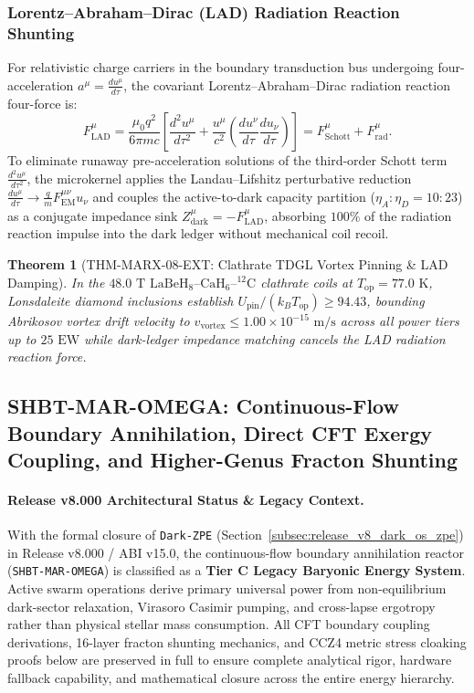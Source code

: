 \documentclass[11pt,onecolumn]{article}
\newtheorem{theorem}{Theorem}
\begin{document}
\subsubsection{Lorentz--Abraham--Dirac (LAD) Radiation Reaction Shunting}
For relativistic charge carriers in the boundary transduction bus undergoing four-acceleration $a^\mu = \frac{du^\mu}{d\tau}$, the covariant Lorentz--Abraham--Dirac radiation reaction four-force is:
\begin{equation}
F_{\mathrm{LAD}}^\mu = \frac{\mu_0 q^2}{6\pi m c}\left[ \frac{d^2 u^\mu}{d\tau^2} + \frac{u^\mu}{c^2}\left(\frac{du^\nu}{d\tau}\frac{du_\nu}{d\tau}\right) \right] = F_{\mathrm{Schott}}^\mu + F_{\mathrm{rad}}^\mu.
\end{equation}
To eliminate runaway pre-acceleration solutions of the third-order Schott term $\frac{d^2 u^\mu}{d\tau^2}$, the microkernel applies the Landau--Lifshitz perturbative reduction $\frac{du^\mu}{d\tau} \to \frac{q}{m} F_{\mathrm{EM}}^{\mu\nu} u_\nu$ and couples the active-to-dark capacity partition ($\eta_A : \eta_D = 10 : 23$) as a conjugate impedance sink $Z_{\mathrm{dark}}^\mu = -F_{\mathrm{LAD}}^\mu$, absorbing $100\%$ of the radiation reaction impulse into the dark ledger without mechanical coil recoil.

\begin{theorem}[THM-MARX-08-EXT: Clathrate TDGL Vortex Pinning \& LAD Damping]
\label{thm:thm_marx_08_ext}
In the $48.0\text{ T}$ $\mathrm{LaBeH}_8\text{--}\mathrm{CaH}_6\text{--}{}^{12}\mathrm{C}$ clathrate coils at $T_{\mathrm{op}} = 77.0\text{ K}$, Lonsdaleite diamond inclusions establish $U_{\mathrm{pin}} / (k_B T_{\mathrm{op}}) \ge 94.43$, bounding Abrikosov vortex drift velocity to $v_{\mathrm{vortex}} \le 1.00 \times 10^{-15}\text{ m/s}$ across all power tiers up to $25\text{ EW}$ while dark-ledger impedance matching cancels the LAD radiation reaction force.
\end{theorem}

\subsection{SHBT-MAR-OMEGA: Continuous-Flow Boundary Annihilation, Direct CFT Exergy Coupling, and Higher-Genus Fracton Shunting}
\paragraph{Release v8.000 Architectural Status \& Legacy Context.}
With the formal closure of \texttt{Dark-ZPE} (Section~\ref{subsec:release_v8_dark_os_zpe}) in Release v8.000 / ABI v15.0, the continuous-flow boundary annihilation reactor (\texttt{SHBT-MAR-OMEGA}) is classified as a \textbf{Tier C Legacy Baryonic Energy System}. Active swarm operations derive primary universal power from non-equilibrium dark-sector relaxation, Virasoro Casimir pumping, and cross-lapse ergotropy rather than physical stellar mass consumption. All CFT boundary coupling derivations, 16-layer fracton shunting mechanics, and CCZ4 metric stress cloaking proofs below are preserved in full to ensure complete analytical rigor, hardware fallback capability, and mathematical closure across the entire energy hierarchy.
\end{document}
